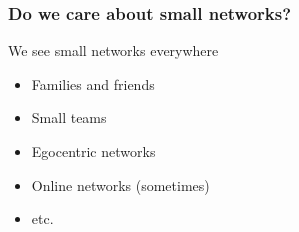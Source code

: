 \documentclass[aspectratio=169, 9pt]{beamer}
\begin{document}
\begin{frame}[c]
\frametitle{Do we care about small networks?}

\begin{minipage}{.40\linewidth}
We see small networks everywhere\pause

\begin{itemize}[<+->]
\item Families and friends
\item Small teams
\item Egocentric networks
\item Online networks (sometimes)
\item etc.
\end{itemize}
\end{minipage}
\hfill
{}
\end{frame}

% 
% 
% 
\end{document}
